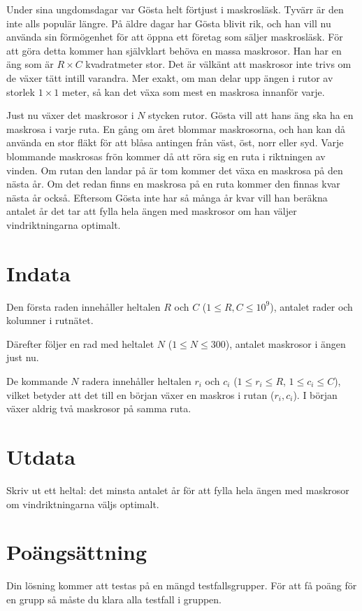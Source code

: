 \noindent

Under sina ungdomsdagar var Gösta helt förtjust i maskrosläsk. Tyvärr är den inte alls populär längre. 
På äldre dagar har Gösta blivit rik, och han vill nu använda sin förmögenhet för att öppna ett företag
som säljer maskrosläsk. För att göra detta kommer han självklart behöva en massa maskrosor. Han har en
äng som är $R \times C$ kvadratmeter stor. Det är välkänt att maskrosor inte trivs om de växer tätt
intill varandra. Mer exakt, om man delar upp ängen i rutor av storlek $1 \times 1$ meter, så kan det växa
som mest en maskrosa innanför varje.

Just nu växer det maskrosor i $N$ stycken rutor. Gösta vill att hans äng ska ha en maskrosa i varje ruta. 
En gång om året blommar maskrosorna, och han kan då använda en stor fläkt för att blåsa antingen från väst,
öst, norr eller syd. Varje blommande maskrosas frön kommer då att röra sig en ruta i riktningen av vinden.
Om rutan den landar på är tom kommer det växa en maskrosa på den nästa år. Om det redan finns en maskrosa
på en ruta kommer den finnas kvar nästa år också. Eftersom Gösta inte har så många år kvar vill han
beräkna antalet år det tar att fylla hela ängen med maskrosor om han väljer vindriktningarna optimalt.

\section*{Indata}
Den första raden innehåller heltalen $R$ och $C$ ($1 \leq R,C \leq 10^9$), antalet rader och kolumner i rutnätet.

Därefter följer en rad med heltalet $N$ ($1 \leq N \leq 300$), antalet maskrosor i ängen just nu.

De kommande $N$ radera innehåller heltalen $r_i$ och $c_i$ ($1 \leq r_i \leq R$, $1 \leq c_i \leq C$), vilket betyder
att det till en början växer en maskros i rutan ($r_i, c_i$). I början växer aldrig två maskrosor på samma ruta.

\section*{Utdata}
Skriv ut ett heltal: det minsta antalet år för att fylla hela ängen med maskrosor om vindriktningarna väljs optimalt.

\section*{Poängsättning}
Din lösning kommer att testas på en mängd testfallsgrupper.
För att få poäng för en grupp så måste du klara alla testfall i gruppen.

